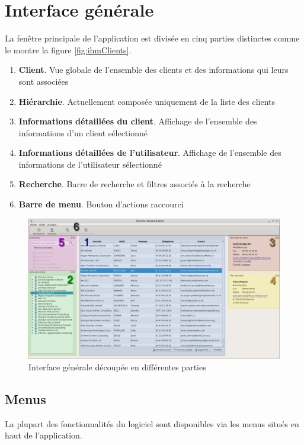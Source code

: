 \chapter{Interface générale}
La fenêtre principale de l'application est divisée en cinq parties distinctes comme le montre la figure \ref{fig:ihmClients}. 

\begin{enumerate}
	\item \textbf{Client}. Vue globale de l'ensemble des clients et des informations qui leurs sont associées	
	\item \textbf{Hiérarchie}. Actuellement composée uniquement de la liste des clients
	\item \textbf{Informations détaillées du client}. Affichage de l'ensemble des informations d’un client sélectionné
	\item \textbf{Informations détaillées de l'utilisateur}. Affichage de l'ensemble des informations de l'utilisateur sélectionné 
	\item \textbf{Recherche}. Barre de recherche et filtres associés à la recherche
	\item \textbf{Barre de menu}. Bouton d’actions raccourci
\end{enumerate}

\begin{figure}[H]
	\centering
	\includegraphics[width=15cm]{screens/ihm.jpg}
	\caption{Interface générale découpée en différentes parties}
	\label{fig:ihm}
\end{figure}

\section{Menus}
La plupart des fonctionnalités du logiciel sont disponibles via les menus situés en haut de l’application. 

